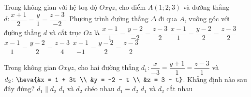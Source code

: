 \begin{ex}%
	Trong không gian với hệ toạ độ $Oxyz$, cho điểm $A(1;2;3)$ và đường thẳng $d  \colon \dfrac{x+1}{2}=\dfrac{y}{1}=\dfrac{z-3}{-2}$. Phương trình đường thẳng $\Delta$ đi qua $A$, vuông góc với đường thẳng $d$ và cắt trục $Oz$ là
	\choice 
		{$\dfrac{x-1}{1}=\dfrac{y-2}{-2}=\dfrac{z-3}{2}$} 
		{\True  $\dfrac{x-1}{1}=\dfrac{y-2}{2}=\dfrac{z-3}{2}$}
		{$\dfrac{x-1}{1}=\dfrac{y-2}{2}=\dfrac{z-3}{4}$} 
		{$\dfrac{x-1}{-1}=\dfrac{y-2}{2}=\dfrac{z-3}{2}$} 
\end{ex}

\begin{ex}%
	Trong không gian $Oxyz$, cho hai đường thẳng $d_1 \colon  \dfrac{x}{-3} = \dfrac{y+1}{1} = \dfrac{z-3}{1}$ và
	$d_2 \colon \heva{&x = 1 + 3t \\ &y = -2 - t \\ &z = 3 - t}$. 
	Khẳng định nào sau đây đúng? 
	 \choice
		{\True $d_1  \parallel d_2$}
		{$d_1$  và $d_2$ chéo nhau}
		{$d_1  \equiv d_2$}
		{$d_1$ và $d_2$ cắt nhau} 
\end{ex}

